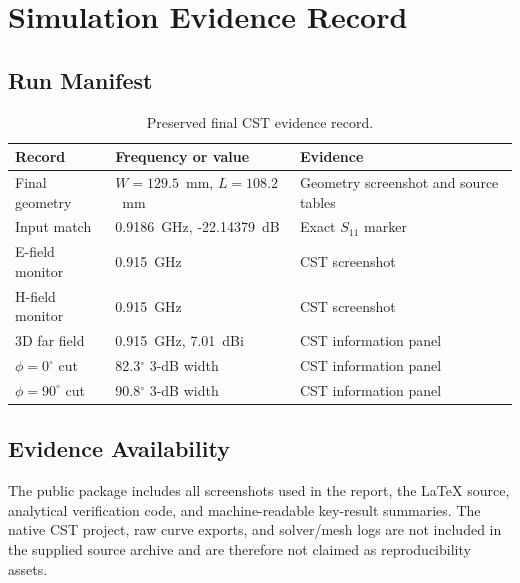 \chapter{Simulation Evidence Record}
\label{app:simulation-record}

\section{Run Manifest}

\begin{table}[H]
\centering
\caption{Preserved final CST evidence record.}
\label{tab:run-manifest}
\begin{tabularx}{\textwidth}{@{}p{}p{}X@{}}
\toprule
\textbf{Record} & \textbf{Frequency or value} & \textbf{Evidence} \\
\midrule
Final geometry & $W=129.5$~mm, $L=108.2$~mm & Geometry screenshot and source tables \\
Input match & 0.9186~GHz, -22.14379~dB & Exact $S_{11}$ marker \\
E-field monitor & 0.915~GHz & CST screenshot \\
H-field monitor & 0.915~GHz & CST screenshot \\
3D far field & 0.915~GHz, 7.01~dBi & CST information panel \\
$\phi=0^\circ$ cut & 82.3$^\circ$ 3-dB width & CST information panel \\
$\phi=90^\circ$ cut & 90.8$^\circ$ 3-dB width & CST information panel \\
\bottomrule
\end{tabularx}
\end{table}

\section{Evidence Availability}

The public package includes all screenshots used in the report, the LaTeX source,
analytical verification code, and machine-readable key-result summaries. The native
CST project, raw curve exports, and solver/mesh logs are not included in the supplied
source archive and are therefore not claimed as reproducibility assets.
